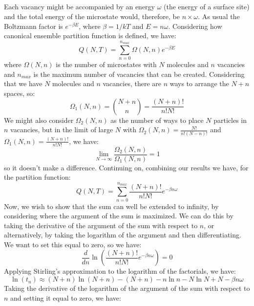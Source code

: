 \documentclass[12pt]{article}
\begin{document}
\subsection{}
Each vacancy might be accompanied by an energy $\omega$ (the energy of a surface site) and the total energy of the microstate would, therefore, be $n\times \omega$.
As usual the Boltzmann factor is $e^{-\beta E}$, where $\beta=1/kT$ and $E=n\omega$.
Considering how canonical ensemble partition function is defined, we have:
\begin{equation}
  Q(N,T)=\sum_{n=0}^{n_{max}}\Omega (N,n)e^{-\beta E}
\end{equation}
where $\Omega (N,n)$ is the number of microstates with $N$ molecules and $n$ vacancies and $n_{max}$ is the maximum number of vacancies that can be created.
Considering that we have $N$ molecules and $n$ vacancies, there are $n$ ways to arrange the $N+n$ spaces, so:
\begin{equation}
  \Omega_1 (N,n)= \binom{N+n}{n} = \frac{(N+n)!}{n!N!}
\end{equation}
We might also consider $\Omega_2 (N,n)$ as the number of ways to place $N$ particles in $n$ vacancies, but in the limit of large $N$ with $\Omega_2 (N,n)=\frac{N!}{n!(N-n)!}$ and $\Omega_1 (N,n)=\frac{(N+n)!}{n!N!}$, we have:
\begin{equation}
  \lim_{N\to \infty}\frac{\Omega_2 (N,n)}{\Omega_1 (N,n)}=1
\end{equation}
so it doesn't make a difference.
Continuing on, combining our results we have, for the partition function:
\begin{equation}
  Q(N,T)=\sum_{n=0}^{n_{max}}\frac{(N+n)!}{n!N!}e^{-\beta n\omega}
\end{equation}
Now, we wish to show that the sum can well be extended to infinity, by considering where the argument of the sum is maximized. We can do this by taking the derivative of the argument of the sum with respect to $n$, or alternatively, by taking the logarithm of the argument and then differentiating. We want to set this equal to zero, so we have:
\begin{equation}
  \frac{d}{dn}\ln\left(\frac{(N+n)!}{n!N!}e^{-\beta n\omega}\right)=0
\end{equation}
Applying Stirling's approximation to the logarithm of the factorials, we have:
\begin{equation}
  \ln(t_{n}) \approx (N+n)\ln (N+n)-(N+n)-n\ln n- N\ln N +N -\beta n\omega
\end{equation}
Taking the derivative of the logarithm of the argument of the sum with respect to $n$ and setting it equal to zero, we have:
\end{document}
